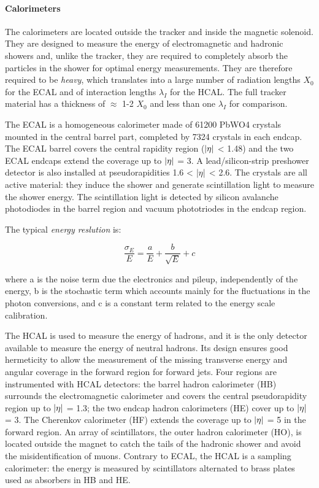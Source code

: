 \paragraph{Calorimeters}

The calorimeters are located outside the tracker and inside the magnetic solenoid. They are
designed to measure the energy of electromagnetic and hadronic showers and, unlike the
tracker, they are required to completely absorb the particles in the shower for optimal energy measurements. They are therefore required to be \emph{heavy}, which translates into a large
number of radiation lengths $X_0$ for the ECAL and of interaction lengths $\lambda_I$ for the HCAL.
The full tracker material has a thickness of $\approx$ 1-2 $X_0$ and less than one $\lambda_I$ for comparison.

\begin{outline}
    \1 The ECAL is a homogeneous calorimeter made
    of 61200 PbWO4 crystals mounted in the central barrel part, completed by 7324 crystals in
    each endcap. The ECAL barrel covers the central rapidity region ($\abs{\eta}$ < 1.48) and the two
    ECAL endcaps extend the coverage up to $\abs{\eta}$ = 3. A lead/silicon-strip preshower detector is
    also installed at pseudorapidities 1.6 < $\abs{\eta}$ < 2.6. The crystals are all active material: they
    induce the shower and generate scintillation light to measure the shower energy. The scintillation light is detected by silicon avalanche photodiodes in the barrel region and vacuum
    phototriodes in the endcap region. 
    
    The typical \emph{energy reslution} is:
    
    \begin{equation*}
        \frac{\sigma_E}{E} = \frac{a}{E} + \frac{b}{\sqrt{E}} + c
        \end{equation*}
        
    where a is the noise term due the electronics and pileup, independently of the energy, b is
    the stochastic term which accounts mainly for the fluctuations in the photon conversions,
    and c is a constant term related to the energy scale calibration.
    
    \1 The HCAL is used to measure the energy of hadrons, and it
    is the only detector available to measure the energy of neutral hadrons. Its design ensures
    good hermeticity to allow the measurement of the missing transverse energy and angular
    coverage in the forward region for forward jets.
    Four regions are instrumented with HCAL detectors: the barrel hadron calorimeter (HB)
    surrounds the electromagnetic calorimeter and covers the central pseudorapidity region up
    to $\abs{\eta}$ = 1.3; the two endcap hadron calorimeters (HE) cover up to $\abs{\eta}$ = 3. The Cherenkov
    calorimeter (HF) extends the coverage up to $\abs{\eta}$ = 5 in the forward region. An array of scintillators, the outer hadron calorimeter (HO), is located outside the magnet to catch the tails
    of the hadronic shower and avoid the misidentification of muons. Contrary to ECAL, the HCAL is a sampling calorimeter: the energy is measured by scintillators alternated to brass plates used as absorbers in HB and HE.
    

\end{outline}
